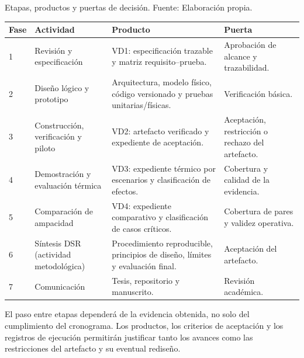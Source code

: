 \begin{procedure}[htbp]
\caption{Etapas, productos y puertas de decisión. Fuente: Elaboración propia.}
\label{proc:etapas}
\begin{tabularx}{\textwidth}{C{1.0cm}L{3.4cm}Y L{3.2cm}}
\toprule
\textbf{Fase} & \textbf{Actividad} & \textbf{Producto} & \textbf{Puerta} \\
 & Revisión y especificación & VD1: especificación trazable y matriz requisito--prueba. & Aprobación de alcance y trazabilidad. \\
  2 & Diseño lógico y prototipo & Arquitectura, modelo físico, código versionado y pruebas unitarias/físicas. & Verificación básica. \\
  3 & Construcción, verificación y piloto & VD2: artefacto verificado y expediente de aceptación. & Aceptación, restricción o rechazo del artefacto. \\
  4 & Demostración y evaluación térmica & VD3: expediente térmico por escenarios y clasificación de efectos. & Cobertura y calidad de la evidencia. \\
  5 & Comparación de ampacidad & VD4: expediente comparativo y clasificación de casos críticos. & Cobertura de pares y validez operativa. \\
6 & Síntesis DSR (actividad metodológica) & Procedimiento reproducible, principios de diseño, límites y evaluación final. & Aceptación del artefacto. \\
7 & Comunicación & Tesis, repositorio y manuscrito. & Revisión académica. \\
\bottomrule
\end{tabularx}
\end{procedure}

El paso entre etapas dependerá de la evidencia obtenida, no solo del cumplimiento del cronograma. Los productos, los criterios de aceptación y los registros de ejecución permitirán justificar tanto los avances como las restricciones del artefacto y su eventual rediseño.

